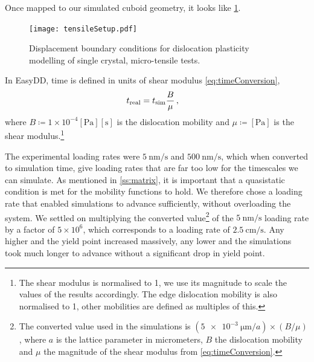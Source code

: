 Once mapped to our simulated cuboid geometry, it looks like \cref{f:tensileSetup}.
\begin{figure}
    \centering
    \texttt{[image: tensileSetup.pdf]}
    \caption[Displacement boundary conditions for dislocation plasticity modelling of single crystal, micro-tensile tests.]{Displacement boundary conditions for dislocation plasticity modelling of single crystal, micro-tensile tests.}
    \label{f:tensileSetup}
\end{figure}

In EasyDD, time is defined in units of shear modulus \cref{eq:timeConversion},
\begin{align}\label{eq:timeConversion}
    t_{\textrm{real}} & = t_{\textrm{sim}} \dfrac{B}{\mu}\,,
\end{align}
where $B \coloneqq 1 \times 10^{-4}[\si{\pascal}][\si{\second}]$ is the dislocation mobility and $\mu \coloneqq [\si{\pascal}]$ is the shear modulus.\footnote{The shear modulus is normalised to 1, we use its magnitude to scale the values of the results accordingly. The edge dislocation mobility is also normalised to 1, other mobilities are defined as multiples of this.}

The experimental loading rates were $\SI{5}{\nano\metre\per\second}$ and $\SI{500}{\nano\metre\per\second}$, which when converted to simulation time, give loading rates that are far too low for the timescales we can simulate. As mentioned in \cref{ss:matrix}, it is important that a quasistatic condition is met for the mobility functions to hold. We therefore chose a loading rate that enabled simulations to advance sufficiently, without overloading the system. We settled on multiplying the converted value\footnote{The converted value used in the simulations is $\left(\SI{5e-3}{\micro\metre}/a\right) \times \left(B /  \mu \right)$, where $a$ is the lattice parameter in micrometers, $B$ the dislocation mobility and $ \mu $ the magnitude of the shear modulus from \cref{eq:timeConversion}.} of the $\SI{5}{\nano\metre\per\second}$ loading rate by a factor of $5 \times 10^6$, which corresponds to a loading rate of $\SI{2.5}{\centi\metre\per\second}$. Any higher and the yield point increased massively, any lower and the simulations took much longer to advance without a significant drop in yield point.

